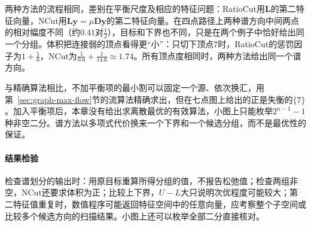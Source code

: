 两种方法的流程相同，差别在平衡尺度及相应的特征问题：RatioCut用$\bm L$的第二特征向量，NCut用$\bm L\bm y=\mu\bm D\bm y$的第二特征向量。在四点路径上两种谱方向中间两点的相对幅度不同（约$0.41$对$\tfrac12$），目标和下界也不同，只是在两个例子中恰好给出同一个分组。体积把连接弱的顶点看得更“小”：只切下顶点$7$时，RatioCut的惩罚因子为$1+\tfrac16$，NCut为$\tfrac1{0.6}+\tfrac1{14.6}\approx1.74$。所有顶点度相同时，两种方法给出同一个谱方向。

与精确算法相比，不加平衡项的最小割可以固定一个源、依次换汇，用第~\ref{sec:graph-max-flow}节的流算法精确求出，但在七点图上给出的正是失衡的$\{7\}$。加入平衡项后，本章没有给出求离散最优的有效算法，小图上只能枚举$2^{n-1}-1$种非空二分。谱方法以多项式代价换来一个下界和一个候选分组，而不是最优性的保证。

\paragraph{结果检验}
检查谱划分的输出时：用原目标重算所得分组的值，不报告松弛值；检查两组非空，NCut还要求体积为正；比较上下界，$U-L$大只说明次优程度可能较大；第二特征值重复时，数值程序可能返回特征空间中的任意向量，应考察整个子空间或比较多个候选方向的扫描结果。小图上还可以枚举全部二分直接核对。
